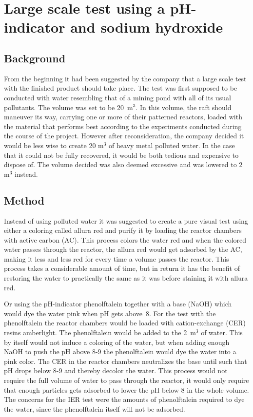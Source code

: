 \section{Large scale test using a pH-indicator and sodium hydroxide}

\subsection{Background}
From the beginning it had been suggested by the company that a large scale test
with the finished product should take place. The test was first supposed to be
conducted with water resembling that of a mining pond with all of its usual
pollutants. The volume was set to be 20~m$^3$. In this volume, the raft should
maneuver its way, carrying one or more of their patterned reactors, loaded with
the material that performs best according to the experiments conducted during
the course of the project.  However after reconsideration, the company decided
it would be less wise to create 20 m$^3$ of heavy metal polluted water. In the
case that it could not be fully recovered, it would be both tedious and
expensive to dispose of. The volume decided was also deemed excessive and was
lowered to 2 m$^3$ instead.

\subsection{Method}
Instead of using polluted water it was suggested to create a pure visual test
using either a coloring called allura red and purify it by loading the reactor
chambers with active carbon (AC). This process colors the water red and when
the colored water passes through the reactor, the allura red would get adsorbed
by the AC, making it less and less red for every time a volume passes the
reactor. This process takes a considerable amount of time, but in return it has
the benefit of restoring the water to practically the same as it was before
staining it with allura red.

Or using the pH-indicator phenolftalein together with a base (NaOH) which would
dye the water pink when pH gets above~8. For the test with the phenolftalein
the reactor chambers would be loaded with cation-exchange (CER) resins
amberlight. The phenolftalein would be added to the 2~m$^3$ of water. This by
itself would not induce a coloring of the water, but when adding enough NaOH to
push the pH above 8-9 the phenolftalein would dye the water into a pink color.
The CER in the reactor chambers neutralizes the base until such that pH drops
below 8-9 and thereby decolor the water. This process would not require the
full volume of water to pass through the reactor, it would only require that
enough particles gets adsorbed to lower the pH below 8 in the whole volume.
The concerns for the IER test were the amounts of phenolftalein required to dye
the water, since the phenolftalein itself will not be adsorbed.

